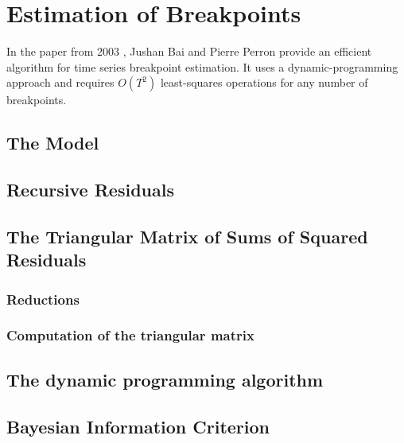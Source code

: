 \documentclass[main.tex]{subfiles}
\begin{document}
\chapter{Estimation of Breakpoints}
\label{chap:breakpoints}
In the paper from 2003 \cite{bai_perron}, Jushan Bai and Pierre Perron provide an
efficient algorithm for time series breakpoint estimation. It uses a dynamic-programming
approach and requires $O(T^2)$ least-squares operations for any number of breakpoints.

\section{The Model}
\label{sec:breakpoints_the_model}

\section{Recursive Residuals}
\label{sec:recursive_residuals}

\section{The Triangular Matrix of Sums of Squared Residuals}
\label{sec:triangular_matrix}
\subsection{Reductions}
\subsection{Computation of the triangular matrix}

\section{The dynamic programming algorithm}
\label{sec:dynamic_algorithm}

\section{Bayesian Information Criterion}
\label{sec:bayesian_information_criterion}
\cite{schwarz1978}
\end{document}
